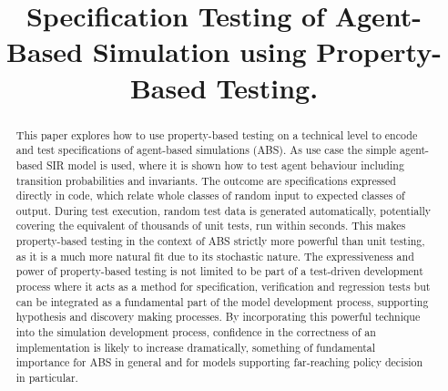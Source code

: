 \documentclass[]{interact}
\theoremstyle{plain}%
\theoremstyle{definition}
\theoremstyle{remark}
\begin{document}

\title{Specification Testing of Agent-Based Simulation using Property-Based Testing.}

\author{
}

\maketitle

\begin{abstract}
This paper explores how to use property-based testing on a technical level to encode and test specifications of agent-based simulations (ABS). As use case the simple agent-based SIR model is used, where it is shown how to test agent behaviour including transition probabilities and invariants. The outcome are specifications expressed directly in code, which relate whole classes of random input to expected classes of output. During test execution, random test data is generated automatically, potentially covering the equivalent of thousands of unit tests, run within seconds. This makes property-based testing in the context of ABS strictly more powerful than unit testing, as it is a much more natural fit due to its stochastic nature. The expressiveness and power of property-based testing is not limited to be part of a test-driven development process where it acts as a method for specification, verification and regression tests but can be integrated as a fundamental part of the model development process, supporting hypothesis and discovery making processes. By incorporating this powerful technique into the simulation development process, confidence in the correctness of an implementation is likely to increase dramatically, something of fundamental importance for ABS in general and for models supporting far-reaching policy decision in particular.
\end{abstract}
\end{document}
